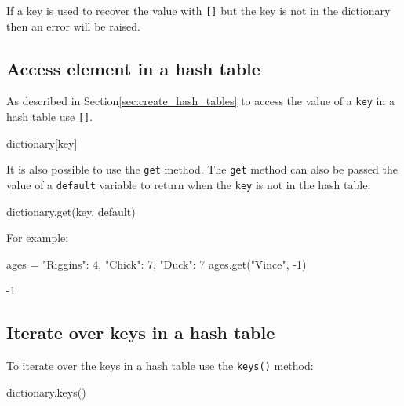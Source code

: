 \begin{note}
If a key is used to recover the value with \texttt{{[}{]}} but the key is not in the dictionary then
an error will be raised.
\end{note}



\subsection{Access element in a hash table}
\label{\detokenize{building-tools/02-functions-and-data-structures/how/main:access-element-in-a-hash-table}}

As described in Section\ref{sec:create_hash_tables} to access the value of a \texttt{key} in a hash
table use \texttt{{[}{]}}.


\begin{api}
dictionary[key]
\end{api}



It is also possible to use the \texttt{get} method.
The \texttt{get} method can also be passed the value of a \texttt{default} variable to return when the
\texttt{key} is not in the hash table:


\begin{pyin}
dictionary.get(key, default)
\end{pyin}



For example:




\begin{pyin}
ages = {"Riggins": 4, "Chick": 7, "Duck": 7}
ages.get("Vince", -1)
\end{pyin}





\begin{raw}
-1
\end{raw}





\subsection{Iterate over keys in a hash table}
\label{\detokenize{building-tools/02-functions-and-data-structures/how/main:iterate-over-keys-in-a-hash-table}}

To iterate over the keys in a hash table use the \texttt{keys()} method:


\begin{api}
dictionary.keys()
\end{api}



